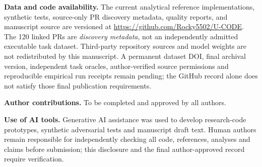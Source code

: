 \documentclass[pdflatex,sn-basic]{sn-jnl}
\begin{document}
\textbf{Data and code availability.}
The current analytical reference implementations, synthetic
tests, source-only PR discovery metadata, quality reports,
and manuscript source are versioned at
\url{https://github.com/Rocky5502/U-CODE}.
The 120 linked PRs are \emph{discovery metadata},
not an independently admitted executable task dataset.
Third-party repository sources and model weights are
not redistributed by this manuscript. A permanent
dataset DOI, final archival version, independent
task oracles, author-verified source permissions
and reproducible empirical run receipts remain
pending; the GitHub record alone does not satisfy
those final publication requirements.

\textbf{Author contributions.} To be completed and approved by all authors.

\textbf{Use of AI tools.} Generative AI assistance was used to develop
research-code prototypes, synthetic adversarial tests and manuscript
draft text. Human authors remain responsible for independently checking
all code, references, analyses and claims before submission; this
disclosure and the final author-approved record require verification.


\end{document}
